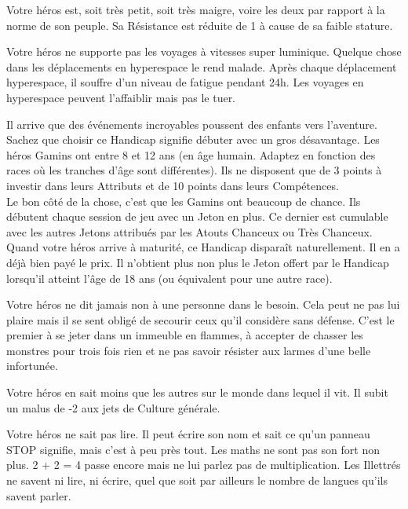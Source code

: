 \begin{description}[align=left]
    \item [Frêle (Majeur)]
        Votre héros est, soit très petit, soit très maigre, voire les deux par rapport à la norme de son peuple. Sa Résistance est réduite de 1 à cause de sa faible stature.

    \item [Mal de l’espace (Mineur)]
        Votre héros ne supporte pas les voyages à vitesses super luminique. Quelque chose dans les déplacements en hyperespace le rend malade. Après chaque déplacement hyperespace, il souffre d’un niveau de fatigue pendant 24h. Les voyages en hyperespace peuvent l’affaiblir mais pas le tuer.

    \item [Gamin (Majeur)]
        Il arrive que des événements incroyables poussent des enfants vers l’aventure. Sachez que choisir ce Handicap signifie débuter avec un gros désavantage. Les héros Gamins ont entre 8 et 12 ans (en âge humain. Adaptez en fonction des races où les tranches d’âge sont différentes). Ils ne disposent que de 3 points à investir dans leurs Attributs et de 10 points dans leurs Compétences.\\
        Le bon côté de la chose, c’est que les Gamins ont beaucoup de chance. Ils débutent chaque session de jeu avec un Jeton en plus. Ce dernier est cumulable avec les autres Jetons attribués par les Atouts Chanceux ou Très Chanceux. Quand votre héros arrive à maturité, ce Handicap disparaît naturellement. Il en a déjà bien payé le prix. Il n’obtient plus non plus le Jeton offert par le Handicap lorsqu’il atteint l’âge de 18 ans (ou équivalent pour une autre race).

    \item [Héroïque (Majeur)]
        Votre héros ne dit jamais non à une personne dans le besoin. Cela peut ne pas lui plaire mais il se sent obligé de secourir ceux qu’il considère sans défense. C’est le premier à se jeter dans un immeuble en flammes, à accepter de chasser les monstres pour trois fois rien et ne pas savoir résister aux larmes d’une belle infortunée.

    \item [Ignorant (Majeur)]
        Votre héros en sait moins que les autres sur le monde dans lequel il vit. Il subit un malus de -2 aux jets de Culture générale.

    \item [Illettré (Mineur)]
        Votre héros ne sait pas lire. Il peut écrire son nom et sait ce qu’un panneau STOP signifie, mais c’est à peu près tout. Les maths ne sont pas son fort non plus. 2 + 2 = 4 passe encore mais ne lui parlez pas de multiplication. Les Illettrés ne savent ni lire, ni écrire, quel que soit par ailleurs le nombre de langues qu’ils savent parler.


\end{description}
